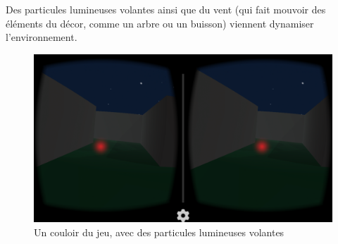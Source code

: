 \medskip

Des particules lumineuses volantes ainsi que du vent (qui fait mouvoir des éléments du décor, comme un arbre ou un buisson) viennent dynamiser l'environnement.

\begin{figure}[h!]
  \centering
  \includegraphics[width=1.0\textwidth]{res/img/couloir.png}
  \caption{Un couloir du jeu, avec des particules lumineuses volantes}
\end{figure}
